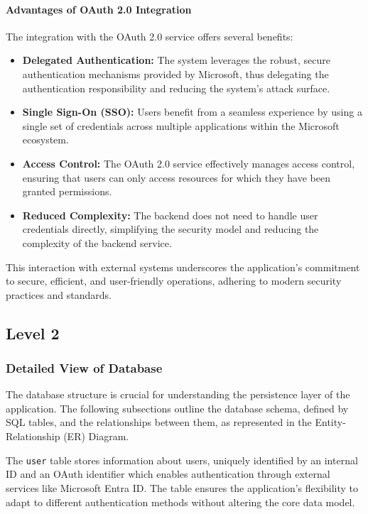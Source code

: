 \paragraph{Advantages of OAuth 2.0 Integration}
The integration with the OAuth 2.0 service offers several benefits:
\begin{itemize}
    \item \textbf{Delegated Authentication:} The system leverages the robust, secure authentication mechanisms provided by Microsoft, thus delegating the authentication responsibility and reducing the system's attack surface.
    \item \textbf{Single Sign-On (SSO):} Users benefit from a seamless experience by using a single set of credentials across multiple applications within the Microsoft ecosystem.
    \item \textbf{Access Control:} The OAuth 2.0 service effectively manages access control, ensuring that users can only access resources for which they have been granted permissions.
    \item \textbf{Reduced Complexity:} The backend does not need to handle user credentials directly, simplifying the security model and reducing the complexity of the backend service.
\end{itemize}

This interaction with external systems underscores the application's commitment to secure, efficient, and user-friendly operations, adhering to modern security practices and standards.

\subsection{Level 2}\label{subsec:level-2}

\subsubsection{Detailed View of Database}

The database structure is crucial for understanding the persistence layer of the application.
The following subsections outline the database schema, defined by SQL tables, and the relationships between them, as represented in the Entity-Relationship (ER) Diagram.

The \texttt{user} table stores information about users, uniquely identified by an internal ID and an OAuth identifier which enables authentication through external services like Microsoft Entra ID. The table ensures the application's flexibility to adapt to different authentication methods without altering the core data model.


